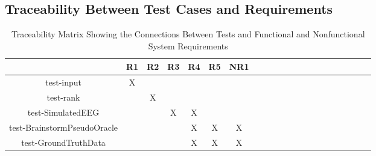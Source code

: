 \documentclass[12pt, titlepage]{article}
\begin{document}
%
%
%		
%
%
%
%					
%					
%					
%					
%					
%
%					
%					
%					
%					
%
%
%

\subsection{Traceability Between Test Cases and Requirements}

\begin{table}[h!]
	\centering
	\begin{tabular}{|c|c|c|c|c|c|c|c|c|c|c|c|c|c|c|c|c|c|c|c|c|}
		\hline        
		& R1 & R2 & R3 & R4 & R5 & NR1 \\
		\hline
		test-input        &X & & & & & \\ \hline
		test-rank        & &X & & & &  \\ \hline
		test-SimulatedEEG        & & &X & X& & \\ \hline
		test-BrainstormPseudoOracle        & & & &X & X& X \\ \hline
		test-GroundTruthData        & & & &X & X& X \\ \hline

	\end{tabular}
\caption{Traceability Matrix Showing the Connections Between Tests and Functional and Nonfunctional System Requirements}
\label{Table:A_trace}
\end{table}
				
\end{document}
